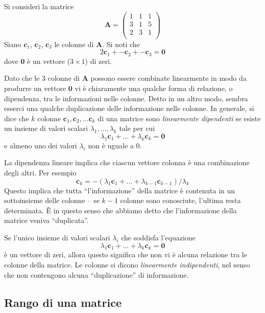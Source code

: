 Si consideri la matrice
    \[
\boldsymbol{A}=
\left(%
\begin{array}{ccc}
  1 & 1 & 1 \\
  3 & 1 & 5 \\
  2 & 3 & 1 \\
\end{array}%
\right)
\]
 Siano  $\boldsymbol{c}_1$,  $\boldsymbol{c}_2$, $\boldsymbol{c}_3$ le
colonne di $\boldsymbol{A}$.
Si noti che
\[
2\boldsymbol{c}_1 + -\boldsymbol{c}_2 + - \boldsymbol{c}_3 =
\boldsymbol{0}
\]
dove  $\boldsymbol{0}$ {\`e} un vettore ($3 \times 1$) di zeri.

Dato che le 3 colonne di $\boldsymbol{A}$ possono essere combinate
linearmente in modo da produrre un vettore $\boldsymbol{0}$ vi {\`e}
chiaramente una qualche forma di relazione, o dipendenza, tra le
informazioni nelle colonne.  Detto in un altro modo, sembra esserci
una qualche duplicazione delle informazione nelle colonne.  In
generale, si dice che $k$ colonne $\boldsymbol{c}_1, \boldsymbol{c}_2,
\dots \boldsymbol{c}_k$ di una matrice sono \emph{linearmente
  dipendenti} se esiste un insieme di valori scalari $\lambda_1,
\dots, \lambda_k$ tale per cui
    \[
    \lambda_1 \boldsymbol{c}_1 + \dots + \lambda_k \boldsymbol{c}_k=\boldsymbol{0}
    \]
    e almeno uno dei valori $\lambda_i$ non {\`e} uguale a 0.

La dipendenza lineare implica che ciascun vettore
    colonna {\`e} una combinazione degli altri.  Per esempio
    \[
   \boldsymbol{c}_k= -(\lambda_1 \boldsymbol{c}_1 + \dots + \lambda_{k-1}
   \boldsymbol{c}_{k-1})/\lambda_k
    \]
    Questo implica che tutta ``l'informazione'' della
    matrice {\`e} contenuta in un sottoinsieme delle colonne -- se
    $k-1$ colonne sono conosciute, l'ultima resta determinata.
È in questo senso che abbiamo detto che l'informazione della  matrice veniva ``duplicata''.

Se l'unico insieme di valori scalari $\lambda_i$ che
    soddisfa l'equazione
    \[
    \lambda_1 \boldsymbol{c}_1 + \dots + \lambda_k \boldsymbol{c}_k=\boldsymbol{0}
    \]
     {\`e} un vettore di zeri, allora
    questo significa che non vi {\`e} alcuna relazione tra le colonne
    della matrice.
  Le colonne si dicono \emph{linearmente indipendenti},
   nel senso che non contengono alcuna ``duplicazione'' di informazione.


\subsection{Rango di una matrice}

